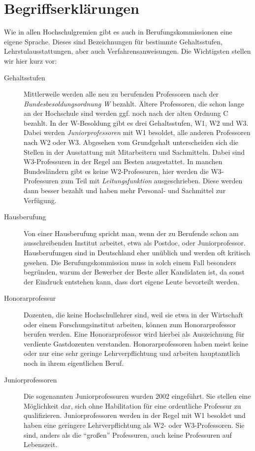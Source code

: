 \documentclass[10pt,twoside,a5paper,openright]{book}
\begin{document}
\section{Begriffserklärungen}
Wie in allen Hochschulgremien gibt es auch in Berufungskommissionen eine eigene Sprache. Dieses sind Bezeichnungen für bestimmte Gehaltsstufen, Lehrstulausstattungen, aber auch Verfahrensanweisungen. Die Wichtigsten stellen wir hier kurz vor:
\begin{description}
	\item [Gehaltsstufen]%
			Mittlerweile werden alle neu zu berufenden Professoren nach der \emph{Bundesbesoldungsordnung W}
			bezahlt. Ältere Professoren, die schon lange an der Hochschule sind werden ggf. noch nach der alten
			Ordnung C bezahlt. In der W-Besoldung gibt es drei Gehaltsstufen, W1, W2 und W3. Dabei werden
			\emph{Juniorprofessoren} mit W1 besoldet, alle anderen Professoren nach W2 oder W3. Abgesehen vom Grundgehalt
			unterscheiden sich die Stellen in der Ausstattung mit Mitarbeitern und Sachmitteln. Dabei sind
			W3-Professuren in der Regel am Besten ausgestattet. In manchen Bundesländern gibt es keine
			W2-Professuren, hier werden die W3-Professuren zum Teil mit \emph{Leitungsfunktion} ausgeschrieben.
			Diese werden dann besser bezahlt und haben mehr Personal- und Sachmittel zur Verfügung.

	\item [Hausberufung]
			Von einer Hausberufung spricht man, wenn der zu Berufende schon am ausschreibenden Institut arbeitet,
			etwa als Postdoc, oder Juniorprofessor. Hausberufungen sind in Deutschland eher unüblich und werden
			oft kritisch gesehen. Die Berufungskommission muss in solch einem Fall besonders begründen, warum der Bewerber
			der Beste aller Kandidaten ist, da sonst der Eindruck entstehen kann, dass dort eigene Leute
			bevorteilt werden.
			
	\item [Honorarprofessur]
			Dozenten, die keine Hochschullehrer sind, weil sie etwa in der Wirtschaft oder einem Forschungsinstitut
			arbeiten, können zum Honorarprofessor berufen werden. Eine Honorarprofessor wird hierbei als Auszeichnung für
			verdiente Gastdozenten verstanden. Honorarprofessoren haben meist keine oder nur eine sehr geringe
			Lehrverpflichtung und arbeiten hauptamtlich noch in ihrem eigentlichen Beruf.
			
	\item [Juniorprofessoren]
			Die sogenannten Juniorprofessuren wurden 2002 eingeführt. Sie stellen eine Möglichkeit dar, sich
			ohne Habilitation für eine ordentliche Professur zu qualifizieren. Juniorprofessoren werden in der Regel mit W1
			besoldet und haben eine geringere Lehrverpflichtung als W2- oder W3-Professoren. Sie sind, anders als die "`großen"'
			Professuren, auch keine Professuren auf Lebenszeit.


\end{description}
\end{document}
